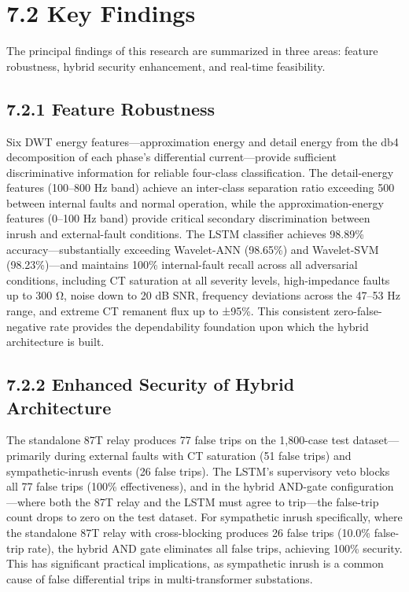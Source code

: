 \section{7.2  Key Findings}
The principal findings of this research are summarized in three areas: feature robustness, hybrid security enhancement, and real-time feasibility.


\subsection{7.2.1  Feature Robustness}
Six DWT energy features---approximation energy and detail energy from the db4 decomposition of each phase's differential current---provide sufficient discriminative information for reliable four-class classification. The detail-energy features (100--800 Hz band) achieve an inter-class separation ratio exceeding 500 between internal faults and normal operation, while the approximation-energy features (0--100 Hz band) provide critical secondary discrimination between inrush and external-fault conditions. The LSTM classifier achieves 98.89\% accuracy---substantially exceeding Wavelet-ANN (98.65\%) and Wavelet-SVM (98.23\%)---and maintains 100\% internal-fault recall across all adversarial conditions, including CT saturation at all severity levels, high-impedance faults up to 300 Ω, noise down to 20 dB SNR, frequency deviations across the 47--53 Hz range, and extreme CT remanent flux up to ±95\%. This consistent zero-false-negative rate provides the dependability foundation upon which the hybrid architecture is built.


\subsection{7.2.2  Enhanced Security of Hybrid Architecture}
The standalone 87T relay produces 77 false trips on the 1,800-case test dataset---primarily during external faults with CT saturation (51 false trips) and sympathetic-inrush events (26 false trips). The LSTM's supervisory veto blocks all 77 false trips (100\% effectiveness), and in the hybrid AND-gate configuration---where both the 87T relay and the LSTM must agree to trip---the false-trip count drops to zero on the test dataset. For sympathetic inrush specifically, where the standalone 87T relay with cross-blocking produces 26 false trips (10.0\% false-trip rate), the hybrid AND gate eliminates all false trips, achieving 100\% security. This has significant practical implications, as sympathetic inrush is a common cause of false differential trips in multi-transformer substations.


